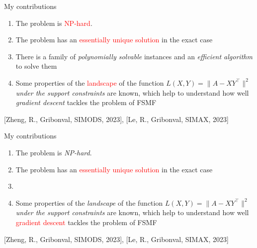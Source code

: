 \documentclass{beamer}
\begin{document}

\begin{frame}{My contributions}
		
		\begin{enumerate}
				\item The problem is   \textcolor{red}{NP-hard}.
		\vfill
		
		\item The problem has an  \textcolor{red}{essentially unique solution} in the exact case

\vfill

		
		\item There is a family of \emph{polynomially solvable} instances and  an  \emph{efficient algorithm} to solve them
		
		\vfill
		\item Some properties of the \textcolor{red}{landscape} of the function $L(X,Y) = \|A - XY^\top\|^2$ \emph{under the support constraints} are known, which help to understand how well \emph{gradient descent} tackles the problem of FSMF
		
		
		
	\end{enumerate}
			
		 \small{ \textcolor{mygreen}{[Zheng, R., Gribonval, SIMODS, 2023]}}, 
 \small{ \textcolor{mygreen}{[Le, R., Gribonval, SIMAX, 2023] }}
					
	
\end{frame}

\begin{frame}{My contributions}
		
		\begin{enumerate}
				\item The problem is  \emph{NP-hard}.
		\vfill
		
		\item The problem has an  \textcolor{red}{essentially unique solution} in the exact case

\vfill

		
		\item  {}
		
		\vfill
		\item Some properties of the \emph{landscape} of the function $L(X,Y) = \|A - XY^\top\|^2$ \emph{under the support constraints} are known, which help to understand how well \textcolor{red}{gradient descent} tackles the problem of FSMF
		
		
		
	\end{enumerate}
		
		
			 \small{ \textcolor{mygreen}{[Zheng, R., Gribonval, SIMODS, 2023]}}, 
 \small{ \textcolor{mygreen}{[Le, R., Gribonval, SIMAX, 2023]}}
	
\end{frame}
\end{document}

